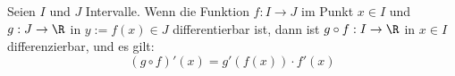 Seien $I$ und $J$ Intervalle. Wenn die Funktion $f: I \to J$ im Punkt $x \in I$ und $g: J \to \R$ in $y := f(x) \in J$ differentierbar ist, dann ist $g \circ f: I \to \R$ in $x \in I$ differenzierbar, und es gilt:
$$(g \circ f)'(x) = g'(f(x)) \cdot f'(x)$$